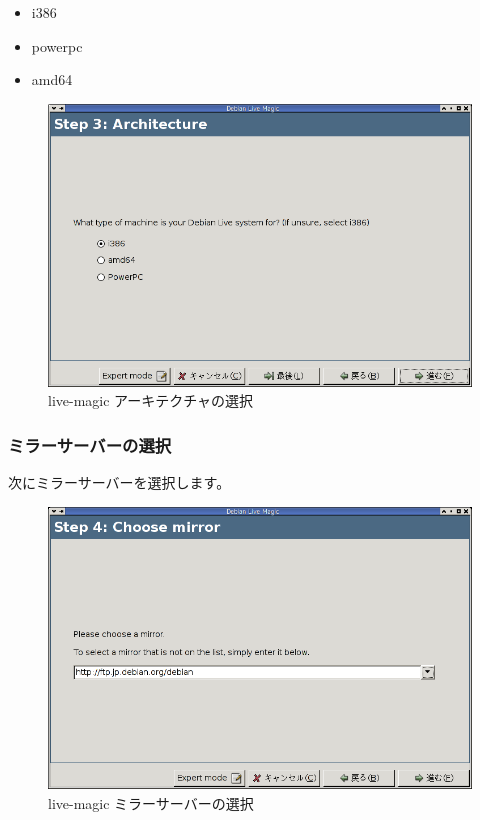 \documentclass[mingoth,a4paper]{jsarticle}
\begin{document}
\begin{multicols}{2}
 \begin{itemize}
 \item i386
 \item powerpc
 \item amd64 
 \end{itemize}

 \begin{figure}[H]
 \begin{center}
  \includegraphics[width=1\hsize]{image200711/live-magic03.png}
 \end{center}
 \caption{live-magic アーキテクチャの選択}
 \label{live-magic03}
 \end{figure}
\end{multicols}

\subsubsection{ミラーサーバーの選択}
\begin{multicols}{2}
 次にミラーサーバーを選択します。

 \begin{figure}[H]
 \begin{center}
  \includegraphics[width=1\hsize]{image200711/live-magic04.png}
 \end{center}
 \caption{live-magic ミラーサーバーの選択}
 \label{live-magic04}
 \end{figure}
\end{multicols}
\end{document}
